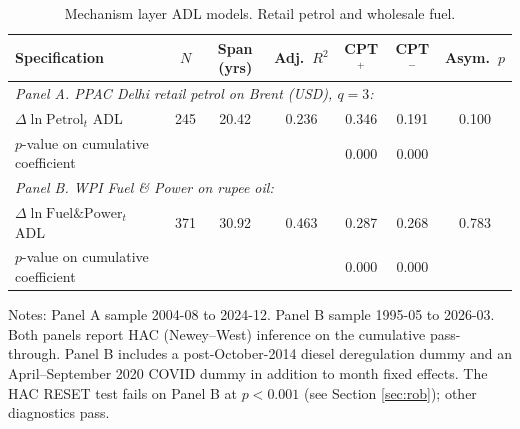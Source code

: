 \begin{table}[t]
\centering
\caption{Mechanism layer ADL models. Retail petrol and wholesale fuel.}
\label{tab:mech}
\footnotesize
\setlength{\tabcolsep}{5pt}
\begin{threeparttable}
\begin{tabular}{l c c c c c c}
\toprule
Specification & $N$ & Span (yrs) & Adj.\ $R^2$ & CPT$^+$ & CPT$^-$ & Asym.\ $p$ \\
\midrule
\multicolumn{7}{l}{\emph{Panel A. PPAC Delhi retail petrol on Brent (USD), $q = 3$:}} \\
$\Delta \ln \mathrm{Petrol}_t$ ADL & 245 & 20.42 & 0.236 & 0.346 & 0.191 & 0.100 \\
$p$-value on cumulative coefficient & & & & 0.000 & 0.000 & \\
\midrule
\multicolumn{7}{l}{\emph{Panel B. WPI Fuel \& Power on rupee oil:}} \\
$\Delta \ln \mathrm{Fuel\&Power}_t$ ADL & 371 & 30.92 & 0.463 & 0.287 & 0.268 & 0.783 \\
$p$-value on cumulative coefficient & & & & 0.000 & 0.000 & \\
\bottomrule
\end{tabular}
\begin{tablenotes}\footnotesize
\item Notes: Panel A sample 2004-08 to 2024-12. Panel B sample 1995-05 to 2026-03. Both panels report HAC (Newey--West) inference on the cumulative pass-through. Panel B includes a post-October-2014 diesel deregulation dummy and an April--September 2020 COVID dummy in addition to month fixed effects. The HAC RESET test fails on Panel B at $p < 0.001$ (see Section \ref{sec:rob}); other diagnostics pass.
\end{tablenotes}
\end{threeparttable}
\end{table}
